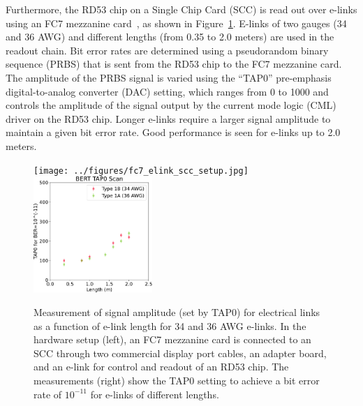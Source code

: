 \documentclass[a4paper,11pt]{article}
\newcommand{\fig}{Figure}
\begin{document}

Furthermore, the RD53 chip on a Single Chip Card (SCC) is read out over e-links using an FC7 mezzanine card~\cite{ref:fc7}, as shown in \fig~\ref{fig:tap0_vs_length}.
E-links of two gauges (34 and 36 AWG) and different lengths (from 0.35 to 2.0 meters) are used in the readout chain.
Bit error rates are determined using a pseudorandom binary sequence (PRBS) that is sent from the RD53 chip to the FC7 mezzanine card.
The amplitude of the PRBS signal is varied using the ``TAP0'' pre-emphasis digital-to-analog converter (DAC) setting, which ranges from 0 to 1000 and controls the amplitude of the signal output by the current mode logic (CML) driver on the RD53 chip.
Longer e-links require a larger signal amplitude to maintain a given bit error rate.
Good performance is seen for e-links up to 2.0 meters.

\begin{figure}[htbp]
\centering
\texttt{[image: ../figures/fc7\_elink\_scc\_setup.jpg]}
\qquad
\includegraphics[width=0.40\textwidth,origin=c]{../figures/BERT_TAP0_vs_Length-crop.pdf}
\caption{
\label{fig:tap0_vs_length}
Measurement of signal amplitude (set by TAP0) for electrical links as a function of e-link length for 34 and 36 AWG e-links.
In the hardware setup (left), an FC7 mezzanine card is connected to an SCC through two commercial display port cables, an adapter board, and an e-link for control and readout of an RD53 chip.
The measurements (right) show the TAP0 setting to achieve a bit error rate of $10^{-11}$ for e-links of different lengths.
}
\end{figure}
\end{document}
